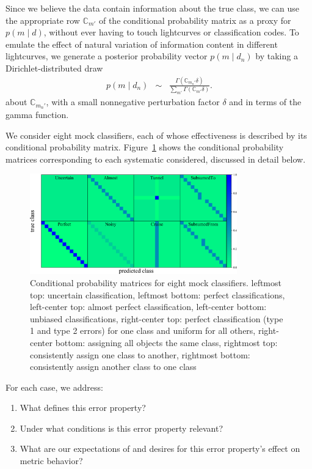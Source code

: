 Since we believe the data contain information about the true class, we can use the appropriate row $\mathbb{C}_{m'}$ of the conditional probability matrix as a proxy for $p(m \mid d)$, without ever having to touch lightcurves or classification codes.
To emulate the effect of natural variation of information content in different lightcurves, we generate a posterior probability vector $p(m \mid d_{n})$ by taking a Dirichlet-distributed draw
\begin{eqnarray}
  \label{eq:cmtoprob}
  p(m \mid d_{n}) &\sim& \frac{\Gamma(\mathbb{C}_{m_{n}'} \delta)}{\sum_{m'} \Gamma(\mathbb{C}_{m'} \delta)}.
\end{eqnarray}
about $\mathbb{C}_{m_{n}'}$, with a small nonnegative perturbation factor $\delta$ and in terms of the gamma function.

We consider eight mock classifiers, each of whose effectiveness is described by its conditional probability matrix.
Figure~\ref{fig:mock_cm} shows the conditional probability matrices corresponding to each systematic considered, discussed in detail below.
\begin{figure}
	\begin{center}
    \includegraphics[width=0.8\textwidth]{./fig/all_sim_cm.png}
		\caption{Conditional probability matrices for eight mock classifiers.
    leftmost top: uncertain classification,
    leftmost bottom: perfect classifications,
    left-center top: almost perfect classification,
    left-center bottom: unbiased classifications,
    right-center top: perfect classification (type 1 and type 2 errors) for one class and uniform for all others,
    right-center bottom: assigning all objects the same class,
    rightmost top: consistently assign one class to another,
    rightmost bottom: consistently assign another class to one class}
		\label{fig:mock_cm}
	\end{center}
\end{figure}
For each case, we address:
\begin{enumerate}
  \item What defines this error property?
  \item Under what conditions is this error property relevant?
  \item What are our expectations of and desires for this error property's effect on metric behavior?
\end{enumerate}

